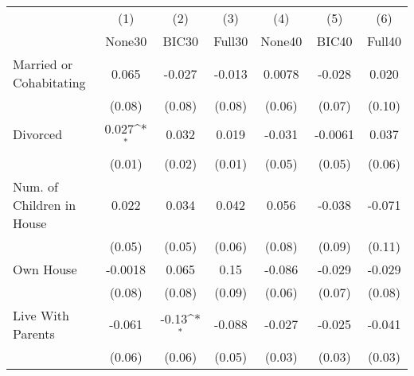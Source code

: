 {
\def\sym#1{\ifmmode^{#1}\else\(^{#1}\)\fi}
\begin{tabular}{l*{6}{c}}
\toprule
            &\multicolumn{1}{c}{(1)}&\multicolumn{1}{c}{(2)}&\multicolumn{1}{c}{(3)}&\multicolumn{1}{c}{(4)}&\multicolumn{1}{c}{(5)}&\multicolumn{1}{c}{(6)}\\
            &\multicolumn{1}{c}{None30}&\multicolumn{1}{c}{BIC30}&\multicolumn{1}{c}{Full30}&\multicolumn{1}{c}{None40}&\multicolumn{1}{c}{BIC40}&\multicolumn{1}{c}{Full40}\\
\midrule
Married or Cohabitating&       0.065         &      -0.027         &      -0.013         &      0.0078         &      -0.028         &       0.020         \\
            &      (0.08)         &      (0.08)         &      (0.08)         &      (0.06)         &      (0.07)         &      (0.10)         \\
\addlinespace
Divorced    &       0.027\sym{*}  &       0.032         &       0.019         &      -0.031         &     -0.0061         &       0.037         \\
            &      (0.01)         &      (0.02)         &      (0.01)         &      (0.05)         &      (0.05)         &      (0.06)         \\
\addlinespace
Num. of Children in House&       0.022         &       0.034         &       0.042         &       0.056         &      -0.038         &      -0.071         \\
            &      (0.05)         &      (0.05)         &      (0.06)         &      (0.08)         &      (0.09)         &      (0.11)         \\
\addlinespace
Own House   &     -0.0018         &       0.065         &        0.15         &      -0.086         &      -0.029         &      -0.029         \\
            &      (0.08)         &      (0.08)         &      (0.09)         &      (0.06)         &      (0.07)         &      (0.08)         \\
\addlinespace
Live With Parents&      -0.061         &       -0.13\sym{*}  &      -0.088         &      -0.027         &      -0.025         &      -0.041         \\
            &      (0.06)         &      (0.06)         &      (0.05)         &      (0.03)         &      (0.03)         &      (0.03)         \\
\bottomrule
\end{tabular}
}
